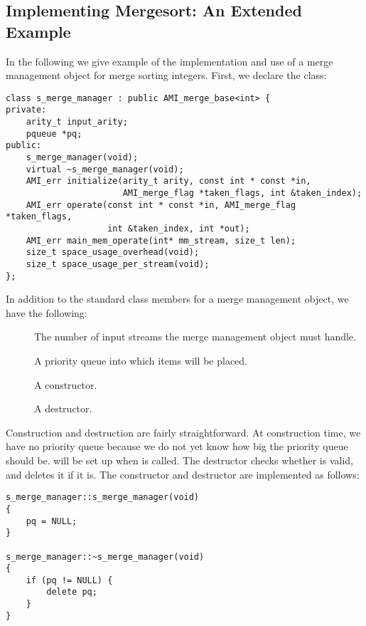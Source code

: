 \subsection{Implementing Mergesort: An Extended Example}
\label{sec:mergesort}

In the following we give example of the implementation and use of a merge
management object for merge sorting integers. First, we declare the class:


\begin{verbatim}
class s_merge_manager : public AMI_merge_base<int> { 
private:
    arity_t input_arity;
    pqueue *pq;
public:
    s_merge_manager(void);
    virtual ~s_merge_manager(void);
    AMI_err initialize(arity_t arity, const int * const *in,
                       AMI_merge_flag *taken_flags, int &taken_index);
    AMI_err operate(const int * const *in, AMI_merge_flag *taken_flags,
                    int &taken_index, int *out);
    AMI_err main_mem_operate(int* mm_stream, size_t len);
    size_t space_usage_overhead(void);
    size_t space_usage_per_stream(void);
};
\end{verbatim}

In addition to the standard class members for a merge management
object, we have the following:

\begin{description}
\item[]
The number of input streams the merge management object must handle.
\item[]
A priority queue into which items will be placed.
\item[]
A constructor.
\item[]
A destructor.
\end{description}

Construction and destruction are fairly straightforward.  At construction
time, we have no priority queue because we do not yet know how big the
priority queue should be.   will be set up when 
is called.  The destructor checks whether
 is valid, and deletes it if it is.  The constructor and
destructor are implemented as follows:

\begin{verbatim}
s_merge_manager::s_merge_manager(void)
{
    pq = NULL;
}

s_merge_manager::~s_merge_manager(void)
{
    if (pq != NULL) {
        delete pq;
    }
}
\end{verbatim}

